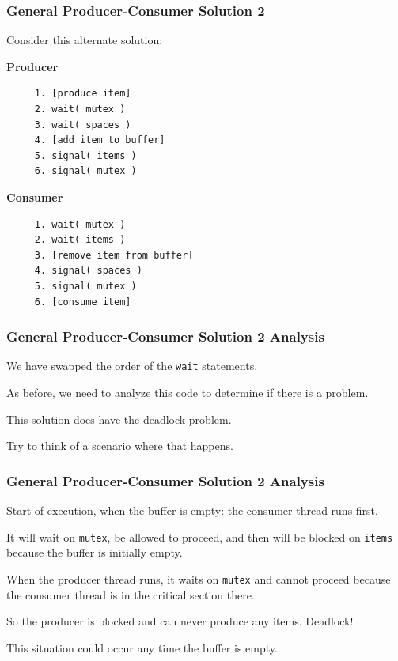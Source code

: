 \begin{frame}[fragile]
\frametitle{General Producer-Consumer Solution 2}

Consider this alternate solution:

\begin{multicols}{2}
\textbf{Producer}
  \begin{verbatim}
	 1. [produce item]
	 2. wait( mutex )
	 3. wait( spaces )
	 4. [add item to buffer]
	 5. signal( items )
	 6. signal( mutex )
  \end{verbatim}
\columnbreak
\textbf{Consumer}
  \begin{verbatim}
	 1. wait( mutex )
	 2. wait( items )
	 3. [remove item from buffer]
	 4. signal( spaces )
	 5. signal( mutex )
	 6. [consume item]
  \end{verbatim}
\end{multicols}

\end{frame}



\begin{frame}
\frametitle{General Producer-Consumer Solution 2 Analysis}

We have swapped the order of the \texttt{wait} statements. 

As before, we need to analyze this code to determine if there is a problem. 

This solution does have the deadlock problem. 

Try to think of a scenario where that happens.

\end{frame}



\begin{frame}
\frametitle{General Producer-Consumer Solution 2 Analysis}

Start of execution, when the buffer is empty: the consumer thread runs first. 

It will wait on \texttt{mutex}, be allowed to proceed, and then will be blocked on \texttt{items} because the buffer is initially empty. 

When the producer thread runs, it waits on \texttt{mutex} and cannot proceed because the consumer thread is in the critical section there. 

So the producer is blocked and can never produce any items. Deadlock!

This situation could occur any time the buffer is empty.

\end{frame}



